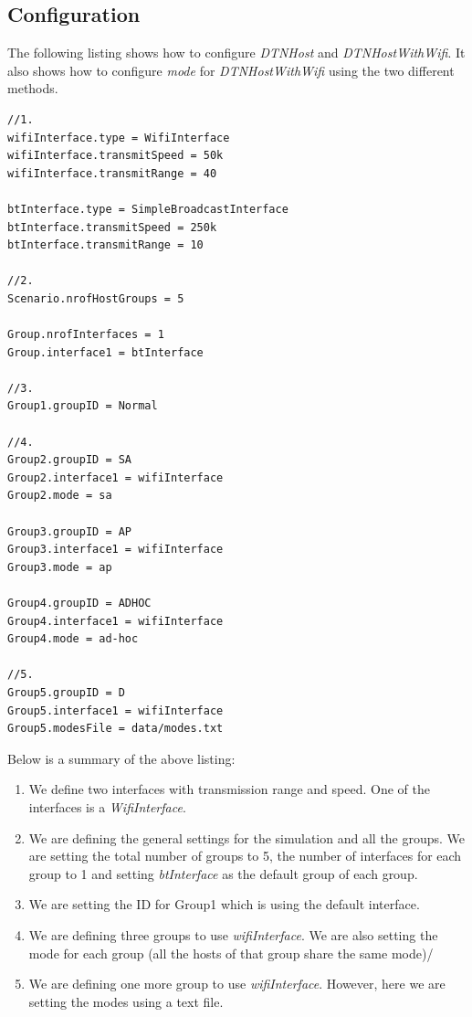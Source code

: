 \subsection{Configuration}
The following listing shows how to configure \textit{DTNHost} and \textit{DTNHostWithWifi}. It also shows how to configure \textit{mode} for \textit{DTNHostWithWifi} using the two different methods.

\begin{lstlisting}[language=bash]
//1.
wifiInterface.type = WifiInterface
wifiInterface.transmitSpeed = 50k
wifiInterface.transmitRange = 40

btInterface.type = SimpleBroadcastInterface
btInterface.transmitSpeed = 250k
btInterface.transmitRange = 10

//2.
Scenario.nrofHostGroups = 5

Group.nrofInterfaces = 1
Group.interface1 = btInterface

//3.
Group1.groupID = Normal

//4.
Group2.groupID = SA
Group2.interface1 = wifiInterface
Group2.mode = sa

Group3.groupID = AP
Group3.interface1 = wifiInterface
Group3.mode = ap

Group4.groupID = ADHOC
Group4.interface1 = wifiInterface
Group4.mode = ad-hoc

//5.
Group5.groupID = D
Group5.interface1 = wifiInterface
Group5.modesFile = data/modes.txt
\end{lstlisting}
Below is a summary of the above listing:
\begin{enumerate}
	\item We define two interfaces with transmission range and speed. One of the interfaces is a \textit{WifiInterface}.
	\item We are defining the general settings for the simulation and all the groups. We are setting the total number of groups to 5, the number of interfaces for each group to 1 and setting \textit{btInterface} as the default group of each group.
	\item We are setting the ID for Group1 which is using the default interface.
	\item We are defining three groups to use \textit{wifiInterface}. We are also setting the mode for each group (all the hosts of that group share the same mode)/
	\item We are defining one more group to use \textit{wifiInterface}. However, here we are setting the modes using a text file.
\end{enumerate}
